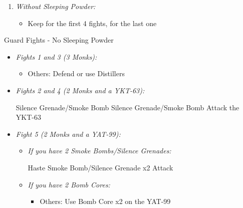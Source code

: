 \begin{enumerate}[resume]
    \item \textit{Without Sleeping Powder:}
    \begin{itemize}
        \item Keep \formation{\tidus}{\rikku}{\lulu} for the first 4 fights, \formation{\tidus}{\rikku}{\kimahri} for the last one
    \end{itemize}
\end{enumerate}
\begin{battle}{Guard Fights - No Sleeping Powder}
    \begin{itemize}
        \item \textit{Fights 1 and 3 (3 Monks):}
        \begin{itemize}
            \tidusf Attack
            \item Others: Defend or use Distillers
        \end{itemize}
        \item \textit{Fights 2 and 4 (2 Monks and a YKT-63):}
        \begin{itemize}
            \switch{\tidus}{\kimahri}
            \kimahrif Silence Grenade/Smoke Bomb
            \rikkuf Silence Grenade/Smoke Bomb
            \switch{\kimahri}{\tidus}
            \tidusf Attack the YKT-63
        \end{itemize}
        \item \textit{Fight 5 (2 Monks and a YAT-99):}
        \begin{itemize}
            \item \textit{If you have 2 Smoke Bombs/Silence Grenades:}
            \begin{itemize}
                \tidusf Haste \rikku
                \rikkuf Smoke Bomb/Silence Grenade x2
                \tidusf Attack
            \end{itemize}
            \item \textit{If you have 2 Bomb Cores:}
            \begin{itemize}
                \tidusf Attack the Monks
                \item Others: Use Bomb Core x2 on the YAT-99
            \end{itemize}
        \end{itemize}
    \end{itemize}
\end{battle}
